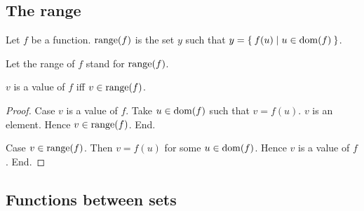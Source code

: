 \documentclass[../../sets-and-functions.ftl.tex]{subfiles}
\begin{document}
  \subsection{The range}

  \begin{forthel}
    \begin{definition}
      Let $f$ be a function.
      $\operatorname{range}(f)$ is the set $y$ such that $y = \Set{f(u) | u \in \operatorname{dom}(f)}$.
    \end{definition}

    Let the range of $f$ stand for $\operatorname{range}(f)$.


    \begin{proposition}[SF 02 01 324423]
      $v$ is a value of $f$ iff $v \in \operatorname{range}(f)$.
    \end{proposition}
    \begin{proof}
      Case $v$ is a value of $f$.
        Take $u \in \operatorname{dom}(f)$ such that $v = f(u)$.
        $v$ is an element.
        Hence $v \in \operatorname{range}(f)$.
      End.

      Case $v \in \operatorname{range}(f)$.
        Then $v = f(u)$ for some $u \in \operatorname{dom}(f)$.
        Hence $v$ is a value of $f$.
      End.
    \end{proof}
  \end{forthel}


  \subsection{Functions between sets}
\end{document}
